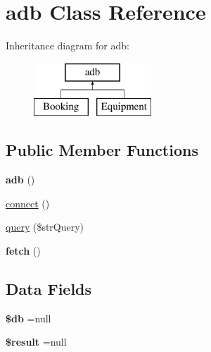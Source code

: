 \hypertarget{classadb}{}\section{adb Class Reference}
\label{classadb}
Inheritance diagram for adb\+:\begin{figure}[H]
\begin{center}
\leavevmode
\includegraphics[height=2.000000cm]{classadb}
\end{center}
\end{figure}
\subsection*{Public Member Functions}
\begin{DoxyCompactItemize}
\item 
{\bfseries adb} ()\hypertarget{classadb_a0ec94bd1d566c9082e1a611c3a1621c1}{}\label{classadb_a0ec94bd1d566c9082e1a611c3a1621c1}

\item 
\hyperlink{classadb_a78572828d11dcdf2a498497d9001d557}{connect} ()
\item 
\hyperlink{classadb_a453053eefc3e4a7f1e9931650d0faf33}{query} (\$str\+Query)
\item 
{\bfseries fetch} ()\hypertarget{classadb_ae48cc10bd727774bb36203986ce3b176}{}\label{classadb_ae48cc10bd727774bb36203986ce3b176}

\end{DoxyCompactItemize}
\subsection*{Data Fields}
\begin{DoxyCompactItemize}
\item 
{\bfseries \$db} =null\hypertarget{classadb_a1fa3127fc82f96b1436d871ef02be319}{}\label{classadb_a1fa3127fc82f96b1436d871ef02be319}

\item 
{\bfseries \$result} =null\hypertarget{classadb_a112ef069ddc0454086e3d1e6d8d55d07}{}\label{classadb_a112ef069ddc0454086e3d1e6d8d55d07}

\end{DoxyCompactItemize}



